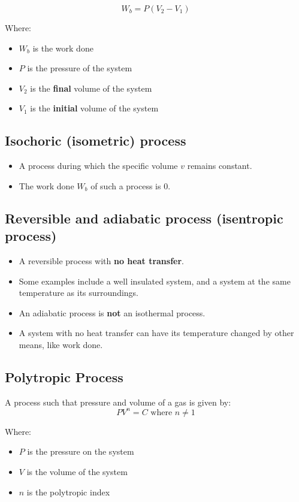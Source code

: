 \documentclass[11pt]{article}
\begin{document}
\[W_b = P \left(V_2 - V_1 \right)\]

Where:
\begin{itemize}
\item \(W_b\) is the work done
\item \(P\) is the pressure of the system
\item \(V_2\) is the \textbf{final} volume of the system
\item \(V_1\) is the \textbf{initial} volume of the system
\end{itemize}

\subsection{Isochoric (isometric) process}
\label{sec:org18ce18e}
\begin{itemize}
\item A process during which the specific volume \(v\) remains constant.
\item The work done \(W_b\) of such a process is 0.
\end{itemize}

\subsection{Reversible and adiabatic process (isentropic process)}
\label{sec:orgf645832}
\begin{itemize}
\item A reversible process with \textbf{no heat transfer}.
\item Some examples include a well insulated system, and a system at the same temperature as its surroundings.
\item An adiabatic process is \textbf{not} an isothermal process.
\item A system with no heat transfer can have its temperature changed by other means, like work done.
\end{itemize}

\subsection{Polytropic Process}
\label{sec:orgf84ad83}
A process such that pressure and volume of a gas is given by:
\[PV^n = C \text{ where } n \ne 1\]

Where:
\begin{itemize}
\item \(P\) is the pressure on the system
\item \(V\) is the volume of the system
\item \(n\) is the polytropic index
\end{itemize}
\end{document}
